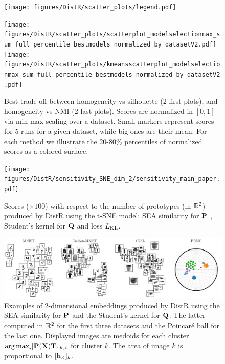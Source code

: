 \begin{figure}[t!]
	\begin{center}
		\centerline{\texttt{[image: figures/DistR/scatter\_plots/legend.pdf]}}\vspace{-1mm}
		\centerline{
			\texttt{[image: figures/DistR/scatter\_plots/scatterplot\_modelselectionmax\_sum\_full\_percentile\_bestmodels\_normalized\_by\_datasetV2.pdf]}\hfill
			\texttt{[image: figures/DistR/scatter\_plots/kmeansscatterplot\_modelselectionmax\_sum\_full\_percentile\_bestmodels\_normalized\_by\_datasetV2.pdf]}
		}
		\caption{Best trade-off between homogeneity vs silhouette (2 first plots), and homogeneity vs NMI (2 last plots). Scores are normalized in $\left[0, 1\right]$ via min-max scaling over a dataset. Small markers represent scores for 5 runs for a given dataset, while big ones are their mean. For each method we illustrate the 20-80\% percentiles of normalized scores as a colored surface.
		}
		\vspace{-0.5cm}
		\label{fig:trade_off}
	\end{center}
	\vspace{-0.3cm}
\end{figure}
\begin{figure}[t!]
	\begin{center}
		\centerline{\texttt{[image: figures/DistR/sensitivity\_SNE\_dim\_2/sensitivity\_main\_paper.pdf]}}
	\end{center}
	\vspace{-0.8cm}
	\caption{Scores ($\times 100$) with respect to the number of prototypes (in $\mathbb{R}^2$) produced by DistR using the t-SNE model: SEA similarity for ${\mathbf{P}}$ \citep{van2023snekhorn}, Student's kernel for ${\mathbf{Q}}$ and loss $L_{\operatorname{KL}}$.}
	\label{fig:sensitivity_main}
	\vspace{-0.0cm}
\end{figure}

\begin{figure}[t!]
	\begin{center}
		\centerline{\includegraphics[width=\columnwidth]{figures/DistR/DistDR_embed.pdf}}
		\caption{Examples of 2-dimensional embeddings produced by DistR using the SEA similarity for ${\mathbf{P}}$ 
		and the Student's kernel for ${\mathbf{Q}}$. The latter computed in $\mathbb{R}^2$ for the first three datasets and the Poincaré ball for the last one.
		Displayed images are medoids for each cluster \ie $\operatorname*{arg\,max}_i [{\mathbf{P}}({\mathbf{X}}){\mathbf{T}}_{:,k}]_i$ for cluster $k$. The area of image $k$ is proportional to $[{\mathbf{h}}_Z]_k$.
		}
		\label{fig:visu_gwdr}
	\end{center}
	\vspace{-0.8cm}
\end{figure}


